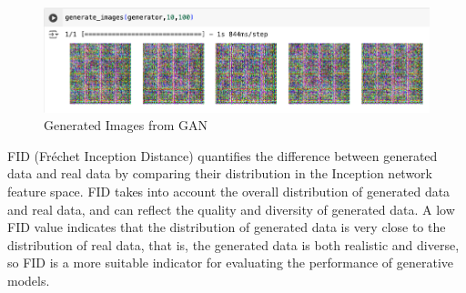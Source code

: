 \begin{figure}[H]
    \centering
    \includegraphics[width=1.2\linewidth]{./Images/generate_images.jpg}
    \caption{Generated Images from GAN}
    \label{fig:my_picture}
\end{figure}


FID (Fréchet Inception Distance) quantifies the difference between generated data and real 
data by comparing their distribution in the Inception network feature space. FID takes into 
account the overall distribution of generated data and real data, and can reflect the quality 
and diversity of generated data. A low FID value indicates that the distribution of generated 
data is very close to the distribution of real data, that is, the generated data is both realistic 
and diverse, so FID is a more suitable indicator for evaluating the performance of generative models.
